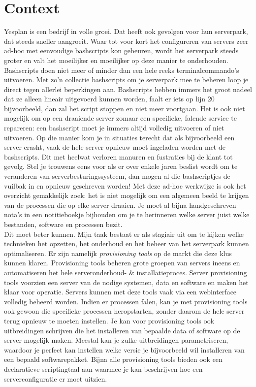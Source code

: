 \documentclass[a4paper,11pt]{article}
\theoremstyle{definition}
\begin{document}
\newpage

\section{Context}\label{context}
Yesplan is een bedrijf in volle groei. Dat heeft ook gevolgen voor hun serverpark,
dat steeds sneller aangroeit. Waar tot voor kort het configureren van 
servers zeer ad-hoc met eenvoudige bashscripts kon gebeuren, wordt het 
serverpark steeds groter en valt het moeilijker en moeilijker op deze manier te 
onderhouden.\\


\noindent Bashscripts doen niet meer of minder dan een hele reeks terminalcommando's uitvoeren. Met zo'n collectie
bashscripts om je serverpark mee te beheren loop je direct tegen allerlei beperkingen aan. Bashscripts hebben immers het groot nadeel dat ze alleen lineair 
uitgevoerd kunnen worden, faalt er iets op lijn 20 bijvoorbeeld, dan zal het script stoppen en 
niet meer voortgaan. Het is ook niet mogelijk om op een draaiende server zomaar 
een specifieke, falende service te repareren: een bashscript moet je immers 
altijd volledig uitvoeren of niet uitvoeren. Op die manier kom je in situaties terecht dat als bijvoorbeeld
een server crasht, vaak de hele server opnieuw moet ingeladen worden met de bashscripts. Dit met heelwat
verloren manuren en fustraties bij de klant tot gevolg. Stel je trouwens eens voor als er over 
enkele jaren beslist wordt om te veranderen van serverbesturingssysteem, dan mogen al die bashscriptjes 
de vuilbak in en opnieuw geschreven worden! Met deze ad-hoc werkwijze is ook het overzicht gemakkelijk zoek:
het is niet mogelijk om een algemeen beeld te krijgen van de processen die op elke server draaien. Je moet al bijna handgeschreven nota's in een notitieboekje bijhouden
om je te herinneren welke server juist welke bestanden, software en processen bezit. \\

\noindent Dit moet beter kunnen. Mijn taak bestaat er als stagiair uit om te 
kijken welke technieken het opzetten, het onderhoud en het beheer van het 
serverpark kunnen optimaliseren. Er zijn namelijk \emph{provisioning tools} op 
de markt die deze klus kunnen klaren. Provisioning tools beheren grote groepen van servers ineens 
en automatiseren het hele serveronderhoud- \& installatieproces. Server provisioning tools
voorzien een server van de nodige systemen, data en software en maken het klaar voor operatie. Servers kunnen met deze tools vaak via een 
webinterface volledig beheerd worden. Indien er processen falen, kan je met 
provisioning tools ook gewoon die specifieke processen heropstarten, zonder 
daarom de hele server terug opnieuw te moeten instellen. Je kan voor provisioning tools 
ook uitbreidingen schrijven die het installeren van bepaalde data of software op de server mogelijk maken.  Meestal kan je zulke uitbreidingen parametriseren, waardoor je 
perfect kan instellen welke versie je bijvoorbeeld wil installeren van een 
bepaald softwarepakket. Bijna alle provisioning tools bieden ook een declaratieve
scriptingtaal aan waarmee je kan beschrijven hoe een serverconfiguratie er moet uitzien. \\
\end{document}
